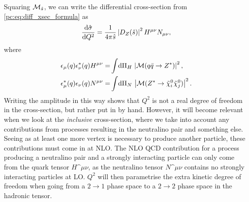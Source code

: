 \documentclass[../main.tex]{subfiles}
\begin{document}
Squaring \(\M_{\hat{s}}\), we can write the differential cross-section from \cref{pc:eq:diff_xsec_formula} as
\begin{equation}
  \d[Q^2]{\hat\sigma} = \frac{1}{4\pi \hat{s}} \abs{D_Z(\hat{s})}^2 H^{\mu\nu}N_{\mu\nu},
\end{equation}
where
\begin{subequations}
  \begin{align}
    \epsilon_{\mu}(q)\epsilon^\ast_{\nu}(q) H^{\mu\nu} = & \integral{\Pi_H} \abs{\M(q\bar{q} \to Z^\ast)}^2,          \\
    \epsilon_{\mu}^\ast(q)\epsilon_{\nu}(q) N^{\mu\nu} = & \integral{\Pi_N} \abs{\M(Z^\ast \to \nino[i] \nino[j])}^2.
  \end{align}
\end{subequations}
Writing the amplitude in this way shows that \(Q^2\) is not a real degree of freedom in the cross-section, but rather put in by hand.
However, it will become relevant when we look at the \emph{inclusive} cross-section, where we take into account any contributions from processes resulting in the neutralino pair and something else.
Seeing as at least one more vertex is necessary to produce another particle, these contributions must come in at NLO\@.
The NLO QCD contribution for a process producing a neutralino pair and a strongly interacting particle can only come from the quark tensor \(H\^{\mu\nu}\), as the neutralino tensor \(N\^{\mu\nu}\) contains no strongly interacting particles at LO\@.
\(Q^2\) will then parametrise the extra kinetic degree of freedom when going from a \(2\to 1\) phase space to a \(2\to 2\) phase space in the hadronic tensor.
\medskip
\end{document}
